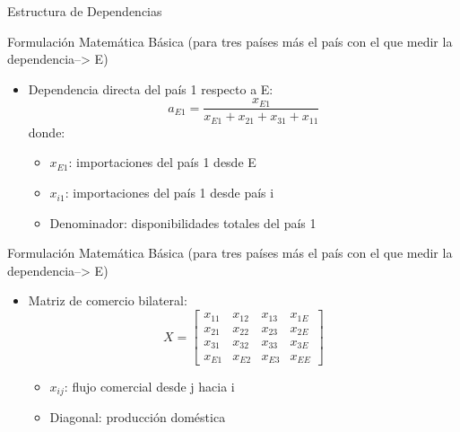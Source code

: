\documentclass{beamer}
\begin{document}
\begin{frame}{Estructura de Dependencias}
    \centering
\end{frame}


\begin{frame}{Formulación Matemática Básica (para tres países más el país con el que medir la dependencia--> E)}
    \begin{itemize}
        \item Dependencia directa del país 1 respecto a E:
        \[ a_{E1} = \frac{x_{E1}}{x_{E1}+x_{21}+x_{31}+x_{11}} \]
        donde:
        \begin{itemize}
            \item $x_{E1}$: importaciones del país 1 desde E
            \item $x_{i1}$: importaciones del país 1 desde país i
            \item Denominador: disponibilidades totales del país 1
        \end{itemize}
        \end{itemize}
\end{frame}
\begin{frame}{Formulación Matemática Básica (para tres países más el país con el que medir la dependencia--> E)}
    \begin{itemize}
    \item Matriz de comercio bilateral:
        \[ X =
        \begin{bmatrix}
        x_{11} & x_{12} & x_{13} & x_{1E} \\
        x_{21} & x_{22} & x_{23} & x_{2E} \\
        x_{31} & x_{32} & x_{33} & x_{3E} \\
        x_{E1} & x_{E2} & x_{E3} & x_{EE}
        \end{bmatrix} \]
        \begin{itemize}
            \item $x_{ij}$: flujo comercial desde j hacia i
            \item Diagonal: producción doméstica
        \end{itemize}
    \end{itemize}
\end{frame}
\end{document}
